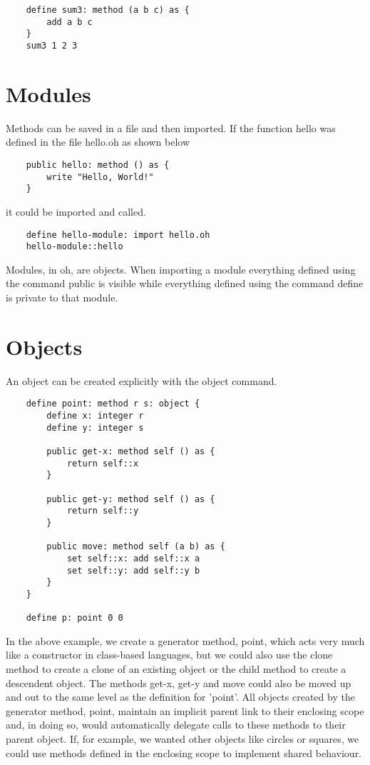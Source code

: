 \documentclass[12pt]{book}
\begin{document}
\begin{lstlisting}
	define sum3: method (a b c) as {
		add a b c
	}
	sum3 1 2 3
\end{lstlisting}


\section{Modules}

Methods can be saved in a file and then imported. If the function hello
was defined in the file hello.oh as shown below

\begin{lstlisting}
	public hello: method () as {
		write "Hello, World!"
	}
\end{lstlisting}

it could be imported and called.

\begin{lstlisting}
	define hello-module: import hello.oh
	hello-module::hello
\end{lstlisting}

Modules, in oh, are objects. When importing a module everything defined
using the command public is visible while everything defined using the
command define is private to that module.


\section{Objects}
An object can be created explicitly with the object command.

\begin{lstlisting}
	define point: method r s: object {
		define x: integer r
		define y: integer s

		public get-x: method self () as {
			return self::x
		}

		public get-y: method self () as {
			return self::y
		}

		public move: method self (a b) as {
			set self::x: add self::x a
			set self::y: add self::y b
		}
	}

	define p: point 0 0
\end{lstlisting}

In the above example, we create a generator method, point, which acts
very much like a constructor in class-based languages, but we could also
use the clone method to create a clone of an existing object or the
child method to create a descendent object.  The methods get-x, get-y
and move could also be moved up and out to the same level as the
definition for 'point'. All objects created by the generator method,
point, maintain an implicit parent link to their enclosing scope and,
in doing so, would automatically delegate calls to these methods to their
parent object. If, for example, we wanted other objects like circles
or squares, we could use methods defined in the enclosing scope to
implement shared behaviour.
\end{document}
